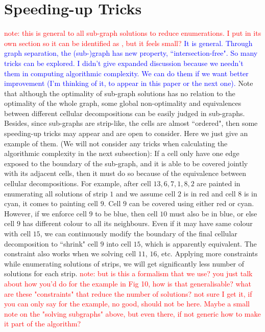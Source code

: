 \documentclass[conference]{IEEEtran}
\begin{document}
\section{Speeding-up Tricks}
\textcolor{red}{note: this is general to all sub-graph solutions to reduce enumerations. I put in its own section so it can be identified as , but it feels small? }
\textcolor{blue}{It is general. Through graph separation, the (sub-)graph has new property, ``intersection-free". So many tricks can be explored. I didn't give expanded discussion because we needn't them in computing algorithmic complexity. We can do them if we want better improvement (I'm thinking of it, to appear in this paper or the next one). }
Note that although the optimality of sub-graph solutions has no relation to the optimality of the whole graph, some global non-optimality and equivalences between different cellular decompositions can be easily judged in sub-graphs. 
Besides, since sub-graphs are strip-like, the cells are almost ``ordered", then some speeding-up tricks may appear and are open to consider. 
Here we just give an example of them. (We will not consider any tricks when calculating the algorithmic complexity in the next subsection): 
If a cell only have one edge exposed to the boundary of the sub-graph, and it is able to be covered jointly with its adjacent cells, then it must do so because of the equivalence between cellular decompositions. 
For example, after cell $13, 6, 7, 1, 8, 2$ are painted in enumerating all solutions of strip $1$ and we assume cell $2$ is in red and cell $8$ is in cyan, it comes to painting cell $9$. 
Cell $9$ can be covered using either red or cyan. However, if we enforce cell $9$ to be blue, then cell $10$ must also be in blue, or else cell $9$ has different colour to all its neighbours. Even if it may have same colour with cell $15$, we can continuously modify the boundary of the final cellular decomposition to ``shrink" cell $9$ into cell $15$, which is apparently equivalent. The constraint also works when we solving cell $11$, $16$, etc. 
Applying more constraints while enumerating solutions of strips, we will get significantly less number of solutions for each strip.  
\textcolor{red}{note: but is this a formalism that we use? you just talk about how you'd do for the example in Fig 10, how is that generalisable? what are these "constraints" that reduce the number of solutions? not sure I get it, if you can only say for the example, no good, should not be here. Maybe a small note on the "solving subgraphs" above, but even there, if not generic how to make it part of the algorithm? }
\end{document}
